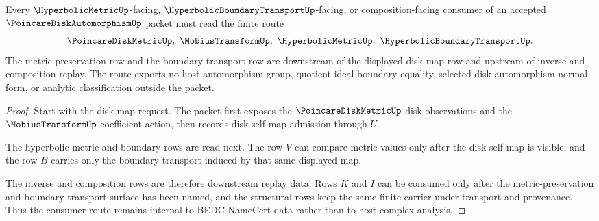 \begin{theorem}
\label{thm:poincare-disk-automorphism-metric-boundary-route}
Every $\HyperbolicMetricUp$-facing, $\HyperbolicBoundaryTransportUp$-facing,
or composition-facing consumer of an accepted $\PoincareDiskAutomorphismUp$
packet must read the finite route
$$
\PoincareDiskMetricUp,\ \MobiusTransformUp,\ \HyperbolicMetricUp,\ \HyperbolicBoundaryTransportUp .
$$
The metric-preservation row and the boundary-transport row are downstream of
the displayed disk-map row and upstream of inverse and composition replay.
The route exports no host automorphism group, quotient ideal-boundary
equality, selected disk automorphism normal form, or analytic classification
outside the packet.
\end{theorem}
\begin{proof}
Start with the disk-map request. The packet first exposes the
$\PoincareDiskMetricUp$ disk observations and the $\MobiusTransformUp$
coefficient action, then records disk self-map admission through $U$.

The hyperbolic metric and boundary rows are read next. The row $V$ can compare
metric values only after the disk self-map is visible, and the row $B$ carries
only the boundary transport induced by that same displayed map.

The inverse and composition rows are therefore downstream replay data. Rows
$K$ and $I$ can be consumed only after the metric-preservation and
boundary-transport surface has been named, and the structural rows keep the
same finite carrier under transport and provenance. Thus the consumer route
remains internal to BEDC NameCert data rather than to host complex analysis.
\end{proof}



